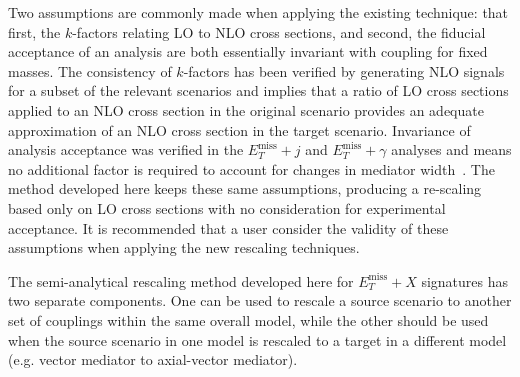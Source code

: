 \documentclass[a4paper, 11pt,notoc]{article}
\newcommand{\MET}{\ensuremath{E_T^\mathrm{miss}}\xspace}
\newcommand{\met}{\MET}
\newcommand{\metplusx}{\ensuremath{\MET+X}\xspace}
\begin{document}
Two assumptions are commonly made when applying the existing technique: that first, the $k$-factors relating LO to NLO cross sections, and second, the fiducial acceptance of an analysis are both essentially invariant with coupling for fixed masses. The consistency of $k$-factors has been verified by generating NLO signals for a subset of the relevant scenarios and implies that a ratio of LO cross sections applied to an NLO cross section in the original scenario provides an adequate approximation of an NLO cross section in the target scenario. Invariance of analysis acceptance was verified in the $\met+j$ and $\met+\gamma$ analyses and means no additional factor is required to account for changes in mediator width~\cite{DMSP}.
The method developed here keeps these same assumptions, producing a re-scaling based only on LO cross sections with no consideration for experimental acceptance. It is recommended that a user consider the validity of these assumptions when applying the new rescaling techniques. 

The semi-analytical rescaling method developed here for \metplusx signatures has two separate components. One can be used to rescale a source scenario to another set of couplings within the same overall model, while the other should be used when the source scenario in one model is rescaled to a target in a different model (e.g. vector mediator to axial-vector mediator).
\end{document}
